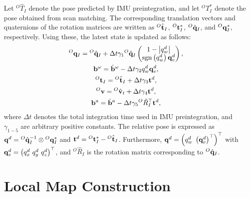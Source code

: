 Let ${}^{O}\hat{T}_{I}$ denote the pose predicted by IMU preintegration, and let ${}^{O}T_{I}^{*}$ denote the pose obtained from scan matching.
The corresponding translation vectors and quaternions of the rotation matrices are written as ${}^{O}\hat{\bf t}_{I}$, ${}^{O}{\bf t}_{I}^{*}$, ${}^{O}\hat{\bf q}_{I}$, and ${}^{O}{\bf q}_{I}^{*}$, respectively.
Using these, the latest state is updated as follows:
%
\begin{align}
  \begin{gathered}
    {}^{O}{\bf q}_{I} = {}^{O}\hat{ {\bf q} }_{I} + \Delta t \gamma_{1} {}^{O}\hat{ {\bf q} }_{I} \left( \begin{matrix} 1 - \left| q_{w}^{d} \right| \\ {\rm sgn} \left( q_{w}^{d} \right) {\bf q}_{v}^{d} \end{matrix} \right), \\
    {\bf b}^{\omega} = \hat{ {\bf b} }^{\omega} - \Delta t \gamma_{2} q_{w}^{d} {\bf q}_{v}^{d}, \\
    {}^{O}{\bf t}_{I} = {}^{O}\hat{ {\bf t} }_{I} + \Delta t \gamma_{3} {\bf t}^{d}, \\
    {}^{O}{\bf v} = {}^{O}\hat{ {\bf v} }_{t} + \Delta t \gamma_{4} {\bf t}^{d}, \\
    {\bf b}^{a} = \hat{ {\bf b} }^{a} - \Delta t \gamma_{5} {}^{O}\hat{R}_{I}^{\top} {\bf t}^{d},
  \end{gathered}
\end{align}
%
where $\Delta t$ denotes the total integration time used in IMU preintegration, and $\gamma_{1-5}$ are arbitrary positive constants.
The relative pose is expressed as ${\bf q}^{d} = {}^{O}\hat{\bf q}_{I}^{-1} \otimes {}^{O}{\bf q}_{I}^{*}$ and ${\bf t}^{d} = {}^{O}{\bf t}_{I}^{*} - {}^{O}\hat{\bf t}_{I}$.
Furthermore, ${\bf q}^{d} = \left( q_{w}^{d} ~ \left( {\bf q}_{v}^{d} \right)^{\top} \right)^{\top}$ with ${\bf q}_{v}^{d} = \left( q_{x}^{d} ~ q_{y}^{d} ~ q_{z}^{d} \right)^{\top}$, and ${}^{O}\hat{R}_{I}$ is the rotation matrix corresponding to ${}^{O}\hat{\bf q}_{I}$.


















\section{Local Map Construction}
\label{subsec:local_map_building}

